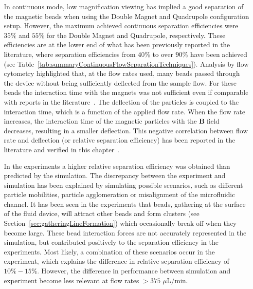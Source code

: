 %
In continuous mode, low magnification viewing has implied a good separation of the magnetic beads when using the Double Magnet and Quadrupole configuration setup. However, the maximum achieved continuous separation efficiencies were $35\%$ and $55\%$ for the Double Magnet and Quadrupole, respectively. These efficiencies are at the lower end of what has been previously reported in the literature, where separation efficiencies from $40\%$ to over $90\%$ have been achieved (see Table~\ref{tab:summaryContinuousFlowSeparationTechniques}). Analysis by flow cytometry highlighted that, at the flow rates used, many beads passed through the device without being sufficiently deflected from the sample flow. For these beads the interaction time with the magnets was not sufficient even if comparable with reports in the literature~\cite{Xia2006,Pamme2004}. The deflection of the particles is coupled to the interaction time, which is a function of the applied flow rate. When the flow rate increases, the interaction time of the magnetic particles with the $\mathbf{B}$ field decreases, resulting in a smaller deflection. This negative correlation between flow rate and deflection (or relative separation efficiency) has been reported in the literature and verified in this chapter~\cite{Cheng2014}. 

In the experiments a higher relative separation efficiency was obtained than predicted by the simulation. The discrepancy between the experiment and simulation has been explained by simulating possible scenarios, such as different particle mobilities, particle agglomeration or misalignment of the microfluidic channel. It has been seen in the experiments that beads, gathering at the surface of the fluid device, will attract other beads and form clusters (see Section~\ref{sec:gatheringLineFormation}) which occasionally break off when they become large. These bead interaction forces are not accurately represented in the simulation, but contributed positively to the separation efficiency in the experiments. Most likely, a combination of these scenarios occur in the experiment, which explains the difference in relative separation efficiency of $10\%-15\%$. However, the difference in performance between simulation and experiment become less relevant at flow rates $>375$ $\mu$L/min.

